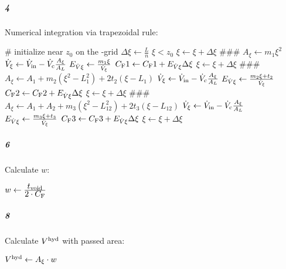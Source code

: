 \subparagraph{4}
Numerical integration via trapezoidal rule:
\begin{algorithmic}
  \State \tiny \# initialize \xi near $z_0$ on the \xi-grid \normalsize
  \State $\Delta\xi \leftarrow \frac{L}{n}$
  \State $\xi < z_0$
  \State $\xi \leftarrow \xi + \Delta\xi$
  \EndWhile
  \State \#\#\#
  \State  $A_\xi \leftarrow m_1 \xi^2 $
  \State $ \dot{V}_\xi \leftarrow \dot{V}_\text{in} - \dot{V}_\text{c} \frac{A_\xi}{A_L} $ 
  \State $E_{\dot{V}\xi} \leftarrow \frac{m_1\xi}{\dot{V}_\xi} $
  \State $C_\text{F}1 \leftarrow C_\text{F}1 + E_{\dot{V}\xi} \Delta\xi$
  \State $\xi \leftarrow \xi + \Delta\xi$
  \EndWhile
  \State \#\#\#
  \State $A_\xi \leftarrow A_1 + m_2 \left( \xi^2 - L_1^2 \right) + 2 t_2\left(\xi - L_1\right) $
  \State $ \dot{V}_\xi \leftarrow \dot{V}_\text{in} - \dot{V}_\text{c} \frac{A_\xi}{A_L} $ 
  \State $E_{\dot{V}\xi} \leftarrow \frac{m_2\xi + t_2}{\dot{V}_\xi} $
  \State $C_\text{F}2 \leftarrow C_\text{F}2 + E_{\dot{V}\xi} \Delta\xi$
  \State $\xi \leftarrow \xi + \Delta\xi$
  \EndWhile
  \State \#\#\#
  \State $A_\xi \leftarrow A_1 + A_2 + m_3 \left( \xi^2 - L_{12}^2 \right) + 2 t_3\left(\xi - L_{12}\right) $
  \State $ \dot{V}_\xi \leftarrow \dot{V}_\text{in} - \dot{V}_\text{c} \frac{A_\xi}{A_L} $ 
  \State $E_{\dot{V}\xi} \leftarrow \frac{m_3\xi + t_3}{\dot{V}_\xi} $
  \State $C_\text{F}3 \leftarrow C_\text{F}3 + E_{\dot{V}\xi} \Delta\xi $
  \State $\xi \leftarrow \xi + \Delta\xi $
  \EndWhile
\end{algorithmic}

\subparagraph{6}
Calculate $w$:
\begin{algorithmic}
\State $w \leftarrow \frac{\displaystyle t_\text{void}}{\displaystyle 2\cdot C_\text{F}} $
\end{algorithmic}
\begin{comment}
\subparagraph{7}
Calculate passed channel area $A$:
\begin{algorithmic}
  \If{$ z_0 \geqq L_1$}
\State  $ A_z \leftarrow (L_{12} - z_0)\cdot( m_2  (L_{12} + z_0) + t_2 ) +  A_3$
\Else
\State  $ A_z \leftarrow  m_1 \cdot (L_1^2 - z_0^2) + A_2 + A_3 $
\EndIf
\end{algorithmic}
\end{comment}

\subparagraph{8}
Calculate $V^\text{hyd}$ with passed area:
\begin{algorithmic}
  \State $V^\text{hyd} \leftarrow A_\xi \cdot w$
\end{algorithmic}
\clearpage


